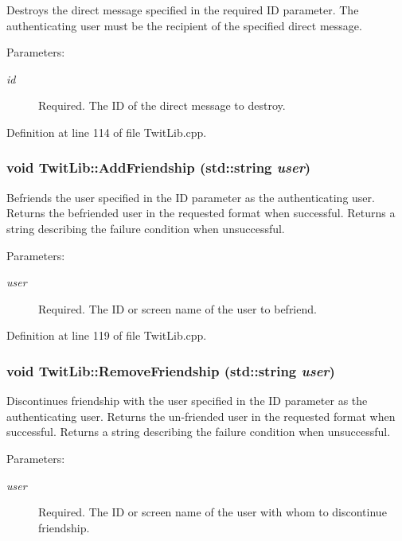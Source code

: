 Destroys the direct message specified in the required ID parameter. The authenticating user must be the recipient of the specified direct message. \begin{Desc}
\item[Parameters:]
\begin{description}
\item[{\em id}]Required. The ID of the direct message to destroy. \end{description}
\end{Desc}


Definition at line 114 of file TwitLib.cpp.\hypertarget{classTwitLib_0ce624472fe8b48f7cfbf0a5740b722a}{
\subsubsection{\setlength{\rightskip}{0pt plus 5cm}void TwitLib::AddFriendship (std::string {\em user})}}
\label{classTwitLib_0ce624472fe8b48f7cfbf0a5740b722a}


Befriends the user specified in the ID parameter as the authenticating user. Returns the befriended user in the requested format when successful. Returns a string describing the failure condition when unsuccessful. \begin{Desc}
\item[Parameters:]
\begin{description}
\item[{\em user}]Required. The ID or screen name of the user to befriend. \end{description}
\end{Desc}


Definition at line 119 of file TwitLib.cpp.\hypertarget{classTwitLib_28e61df6e7bf8614ba93ab612a72d7d9}{
\subsubsection{\setlength{\rightskip}{0pt plus 5cm}void TwitLib::RemoveFriendship (std::string {\em user})}}
\label{classTwitLib_28e61df6e7bf8614ba93ab612a72d7d9}


Discontinues friendship with the user specified in the ID parameter as the authenticating user. Returns the un-friended user in the requested format when successful. Returns a string describing the failure condition when unsuccessful. \begin{Desc}
\item[Parameters:]
\begin{description}
\item[{\em user}]Required. The ID or screen name of the user with whom to discontinue friendship. \end{description}
\end{Desc}


